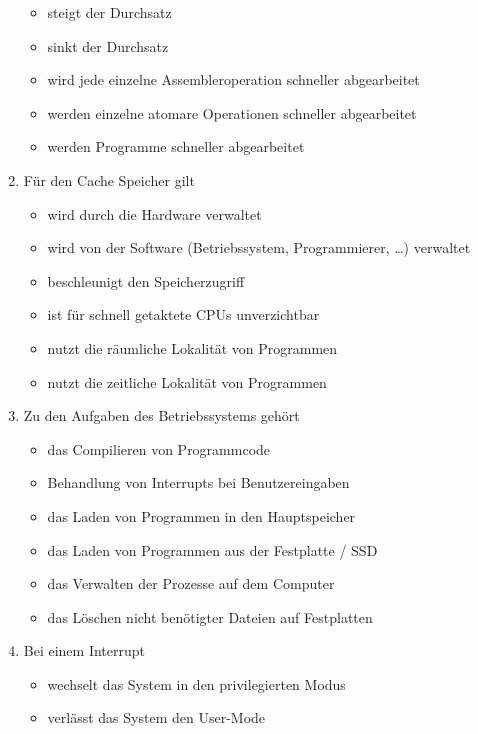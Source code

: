 \documentclass{exercisesheet}
\begin{document}
\begin{enumerate}
\begin{itemize}
          \item steigt der Durchsatz \checkmark
          \item sinkt der Durchsatz
          \item wird jede einzelne Assembleroperation schneller abgearbeitet
          \item werden einzelne atomare Operationen schneller abgearbeitet
          \item werden Programme schneller abgearbeitet \checkmark
        \end{itemize}
      \item Für den Cache Speicher gilt
        \begin{itemize}
          \item wird durch die Hardware verwaltet \checkmark
          \item wird von der Software (Betriebssystem, Programmierer, …) verwaltet
          \item beschleunigt den Speicherzugriff
          \item ist für schnell getaktete CPUs unverzichtbar \checkmark
          \item nutzt die räumliche Lokalität von Programmen \checkmark
          \item nutzt die zeitliche Lokalität von Programmen \checkmark
        \end{itemize}
      \item Zu den Aufgaben des Betriebssystems gehört
        \begin{itemize}
          \item das Compilieren von Programmcode
          \item Behandlung von Interrupts bei Benutzereingaben
          \item das Laden von Programmen in den Hauptspeicher \checkmark
          \item das Laden von Programmen aus der Festplatte / SSD
          \item das Verwalten der Prozesse auf dem Computer \checkmark
          \item das Löschen nicht benötigter Dateien auf Festplatten
        \end{itemize}
      \item Bei einem Interrupt
        \begin{itemize}
          \item wechselt das System in den privilegierten Modus \checkmark
          \item verlässt das System den User-Mode

\end{itemize}
\end{enumerate}
\end{document}
